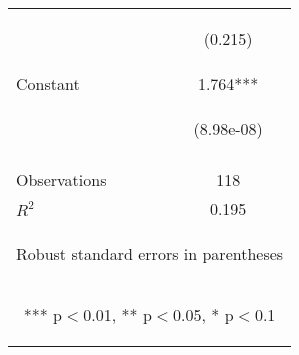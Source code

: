 \begin{center}
\begin{tabular}{lc}
\vspace{4pt} & \begin{footnotesize}(0.215)\end{footnotesize} \\
Constant & 1.764*** \\
 & \begin{footnotesize}(8.98e-08)\end{footnotesize} \\
\vspace{4pt} & \begin{footnotesize}\end{footnotesize} \\
Observations & 118 \\
 $R^2$ & 0.195 \\ \hline
\multicolumn{2}{c}{\begin{footnotesize} Robust standard errors in parentheses\end{footnotesize}} \\
\multicolumn{2}{c}{\begin{footnotesize} *** p$<$0.01, ** p$<$0.05, * p$<$0.1\end{footnotesize}} \\
\end{tabular}
\end{center}
